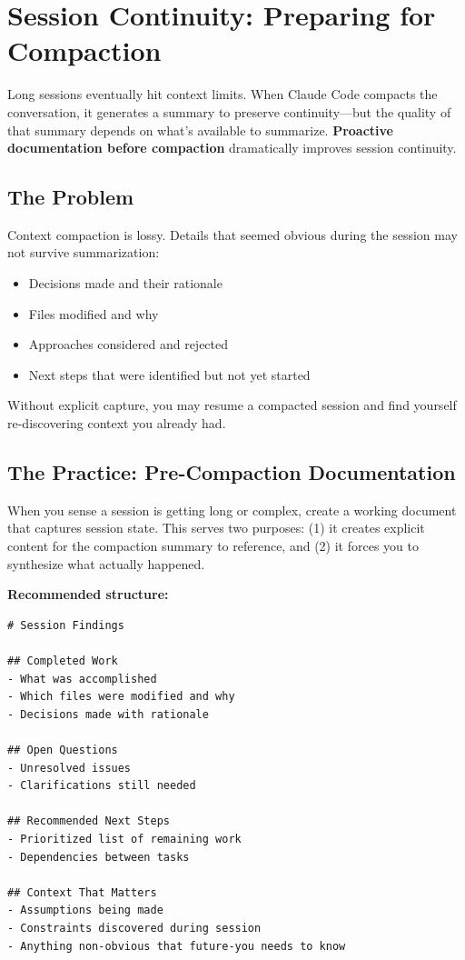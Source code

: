 \section{Session Continuity: Preparing for Compaction}\label{sec:session-continuity}

Long sessions eventually hit context limits. When Claude Code compacts the conversation, it generates a summary to preserve continuity---but the quality of that summary depends on what's available to summarize. \textbf{Proactive documentation before compaction} dramatically improves session continuity.

\subsection{The Problem}

Context compaction is lossy. Details that seemed obvious during the session may not survive summarization:
\begin{itemize}
    \item Decisions made and their rationale
    \item Files modified and why
    \item Approaches considered and rejected
    \item Next steps that were identified but not yet started
\end{itemize}

Without explicit capture, you may resume a compacted session and find yourself re-discovering context you already had.

\subsection{The Practice: Pre-Compaction Documentation}

When you sense a session is getting long or complex, create a working document that captures session state. This serves two purposes: (1) it creates explicit content for the compaction summary to reference, and (2) it forces you to synthesize what actually happened.

\textbf{Recommended structure:}

\begin{lstlisting}
# Session Findings

## Completed Work
- What was accomplished
- Which files were modified and why
- Decisions made with rationale

## Open Questions
- Unresolved issues
- Clarifications still needed

## Recommended Next Steps
- Prioritized list of remaining work
- Dependencies between tasks

## Context That Matters
- Assumptions being made
- Constraints discovered during session
- Anything non-obvious that future-you needs to know
\end{lstlisting}

